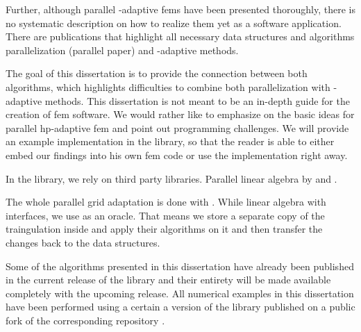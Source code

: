 
Further, although parallel \hp-adaptive \glspl{fem} have been presented thoroughly, there is no systematic description on how to realize them yet as a software application. There are publications that highlight all necessary data structures and algorithms parallelization (parallel paper) and \hp-adaptive methods. %

The goal of this dissertation is to provide the connection between both algorithms, which highlights difficulties to combine both parallelization with \hp-adaptive methods. This dissertation is not meant to be an in-depth guide for the creation of \gls{fem} software. We would rather like to emphasize on the basic ideas for parallel hp-adaptive \gls{fem} and point out programming challenges. We will provide an example implementation in the \dealii{} library, so that the reader is able to either embed our findings into his own \gls{fem} code or use the \dealii{} implementation right away.

In the \dealii{} library, we rely on third party libraries. Parallel linear algebra by \trilinos{} and \petsc{}.

The whole parallel grid adaptation is done with \pforest{}. While linear algebra with interfaces, we use \pforest{} as an oracle. That means we store a separate copy of the traingulation inside \pforest{} and apply their algorithms on it and then transfer the changes back to the \dealii{} data structures.

Some of the algorithms presented in this dissertation have already been published in the current release of the \dealii{} library \parencite{arndt2019} and their entirety will be made available completely with the upcoming release. All numerical examples in this dissertation have been performed using a certain a version of the library published on a public fork \textcite{finaldissertation} of the corresponding \dealii{} repository \textcite{dealii}.
